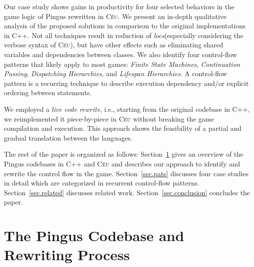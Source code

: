 \documentclass[10pt, conference, compsocconf]{IEEEtran}
\newcommand{\CEU}{\textsc{C\'{e}u}\xspace}
\newcommand{\locs}{\emph{locs}\xspace}
\begin{document}
Our case study shows gains in productivity for four selected behaviors in the
game logic of Pingus rewritten in \CEU.
We present an in-depth qualitative analysis of the proposed solutions in
comparison to the original implementations in C++.
%
Not all techniques result in reduction of \locs (especially considering the
verbose syntax of \CEU), but have other effects such as eliminating shared
variables and dependencies between classes.
%
We also identify four control-flow patterns that likely apply to most games:
        \emph{Finite State Machines},
        \emph{Continuation Passing},
        \emph{Dispatching Hierarchies}, and
        \emph{Lifespan Hierarchies}.
%
A control-flow pattern is a recurring technique to describe execution
dependency and/or explicit ordering between statements.

We employed a \emph{live code rewrite}, i.e., starting from the original
codebase in C++, we reimplemented it piece-by-piece in \CEU without breaking
the game compilation and execution.
%
This approach shows the feasibility of a partial and gradual translation
between the languages.

The rest of the paper is organized as follows:
Section~\ref{sec.codebase} gives an overview of the Pingus codebases in C++ and
\CEU and describes our approach to identify and rewrite the control flow in the
game.
Section~\ref{sec.pats} discusses four case studies in detail which are
categorized in recurrent control-flow patterns.
Section~\ref{sec.related} discusses related work.
Section~\ref{sec.conclusion} concludes the paper.

\section{The Pingus Codebase and Rewriting Process}
\label{sec.codebase}

\end{document}
